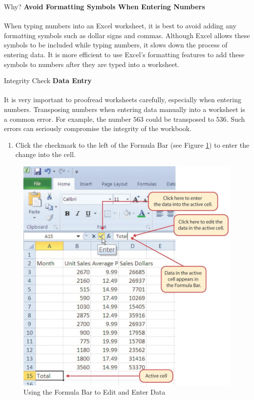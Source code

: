 \begin{center}
	\begin{infobox}{Why?}
		\textbf{Avoid Formatting Symbols When Entering Numbers}
		\\
		\\
		When typing numbers into an Excel worksheet, it is best to avoid adding any formatting symbols such as dollar signs and commas. Although Excel allows these symbols to be included while typing numbers, it slows down the process of entering data. It is more efficient to use Excel's formatting features to add these symbols to numbers after they are typed into a worksheet.
	\end{infobox}
\end{center}

\begin{center}
	\begin{infobox}{Integrity Check}
		\textbf{Data Entry}
		\\
		\\
		It is very important to proofread worksheets carefully, especially when entering numbers. Transposing numbers when entering data manually into a worksheet is a common error. For example, the number $ 563 $ could be transposed to $ 536 $. Such errors can seriously compromise the integrity of the workbook.
	\end{infobox}
\end{center}

\begin{enumerate}[resume]
	\item Click the checkmark to the left of the Formula Bar (see Figure \ref{01:fig17}) to enter the change into the cell.
\end{enumerate}

\begin{figure}[H]
	\centering
	\includegraphics[width=\maxwidth{.95\linewidth}]{gfx/ch01_fig17}
	\caption{Using the Formula Bar to Edit and Enter Data}
	\label{01:fig17}
\end{figure}

